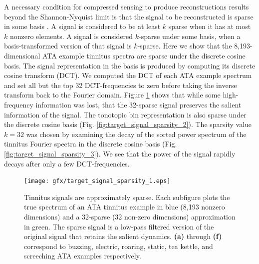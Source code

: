 \documentclass[journal]{IEEEtran}
\begin{document}
A necessary condition for compressed sensing to produce reconstructions results
beyond the Shannon-Nyquist limit is that the signal to be reconstructed is sparse in some basis
\cite{taghoutiCompressedSensing2020}.
A signal is considered to be at least $k$ sparse when it has at most $k$ nonzero elements.
A signal is considered $k$-sparse under some basis, when a basis-transformed version
of that signal is $k$-sparse.
Here we show that the 8,193-dimensional ATA example tinnitus spectra are sparse under
the discrete cosine basis.
The signal representation in the basis is produced by computing its discrete cosine transform (DCT).
We computed the DCT of each ATA example spectrum
and set all but the top 32 DCT-frequencies to zero
before taking the inverse transform back to the Fourier domain.
Figure \ref{fig:target_signal_sparsity_1}
shows that while some high-frequency information was lost,
that the 32-sparse signal preserves the salient information of the signal.
The tonotopic bin representation is also sparse under the discrete cosine basis
(Fig. \ref{fig:target_signal_sparsity_2}).
The sparsity value $k=32$ was chosen by examining the decay of the sorted power spectrum
of the tinnitus Fourier spectra in the discrete cosine basis (Fig. \ref{fig:target_signal_sparsity_3}).
We see that the power of the signal rapidly decays after only a few DCT-frequencies.

\begin{figure}[h]
	\centering
	\texttt{[image: gfx/target\_signal\_sparsity\_1.eps]}
	\caption{Tinnitus signals are approximately sparse.
    Each subfigure plots the true spectrum of an ATA tinnitus example
    in blue (8,193 nonzero dimensions) and a 32-sparse (32 non-zero dimensions)
    approximation in green.
    The sparse signal is a low-pass filtered version of the original signal
    that retains the salient dynamics.
    \textbf{(a)} through \textbf{(f)} correspond to
    buzzing, electric, roaring, static, tea kettle, and screeching ATA examples
    respectively.}
	\label{fig:target_signal_sparsity_1}
\end{figure}
\end{document}
